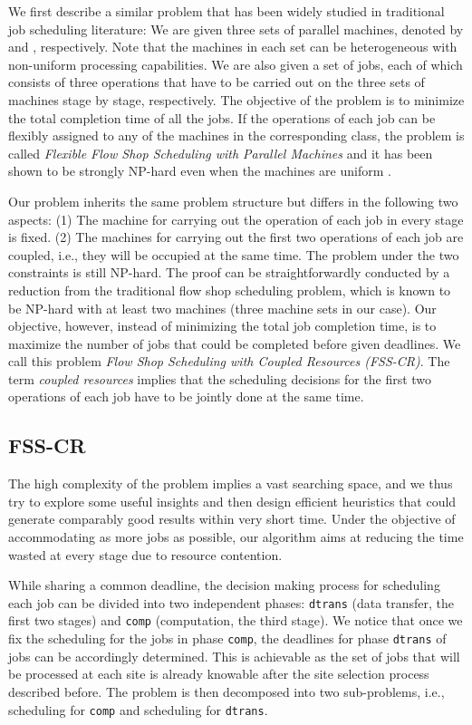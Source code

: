 \documentclass{article}
\begin{document}
We first describe a similar problem that has been widely studied in traditional job scheduling literature: We are given three sets of parallel machines, denoted by  and , respectively. Note that the machines in each set can be heterogeneous with non-uniform processing capabilities. We are also given a set of jobs, each of which consists of three operations that have to be carried out on the three sets of machines stage by stage, respectively. The objective of the problem is to minimize the total completion time of all the jobs. If the operations of each job can be flexibly assigned to any of the machines in the corresponding class, the problem is called {\em Flexible Flow Shop Scheduling with Parallel Machines} and it has been shown to be strongly NP-hard even when the machines are uniform \cite{Kyparisis-OR-2006}. 

Our problem inherits the same problem structure but differs in the following two aspects: (1) The machine for carrying out the operation of each job in every stage is fixed. (2) The machines for carrying out the first two operations of each job are coupled, i.e., they will be occupied at the same time. The problem under the two constraints is still NP-hard. The proof can be straightforwardly conducted by a reduction from the traditional flow shop scheduling problem, which is known to be NP-hard with at least two machines (three machine sets in our case). Our objective, however, instead of minimizing the total job completion time, is to maximize the number of jobs that could be completed before given deadlines. We call this problem {\em Flow Shop Scheduling with Coupled Resources (FSS-CR)}.
The term {\em coupled resources} implies that the scheduling decisions for the first two operations of each job have to be jointly done at the same time.





\subsection{FSS-CR}

The high complexity of the problem implies a vast searching space, and we thus try to explore some useful insights and then design efficient heuristics that could generate comparably good results within very short time. Under the objective of accommodating as more jobs as possible, our algorithm aims at reducing the time wasted at every stage due to resource contention.

While sharing a common deadline, the decision making process for scheduling each job can be divided into two independent phases: \texttt{dtrans} (data transfer, the first two stages) and \texttt{comp} (computation, the third stage). We notice that once we fix the scheduling for the jobs in phase \texttt{comp}, the deadlines for phase \texttt{dtrans} of jobs can be accordingly determined. This is achievable as the set of jobs that will be processed at each site is already knowable after the site selection process described before. The problem is then decomposed into two sub-problems, i.e., scheduling for \texttt{comp} and scheduling for \texttt{dtrans}.
\end{document}
